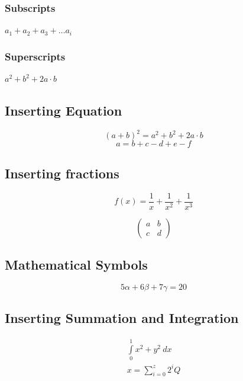 \documentclass[10pt,a4paper,final,conference]{IEEEtran}
\begin{document}
\subsubsection{Subscripts}
$a_1 + a_2 + a_3 + \dots a_i$
\subsubsection{Superscripts}
$a^2 + b^2 +2a \cdot b $


\subsection{Inserting Equation}
\begin{equation}
	(a+b)^2 = a^2 +b^2 + 2 a \cdot b
	\label{eq:1}
\end{equation}
\begin{equation}
a = b+c-d+e-f
\label{eq:simple}
\end{equation}

\subsection{Inserting fractions}
\begin{equation}
f(x) = \frac{1}{x} +\frac{1}{x^2} +\frac{1}{x^3}
\end{equation}

\begin{equation}
\begin{pmatrix}
a&b\\
c&d
\end{pmatrix}
\end{equation}

\subsection{Mathematical Symbols}

\begin{equation}
5\alpha +6\beta +7 \gamma = 20
\end{equation}

\subsection{Inserting Summation and Integration}
\begin{eqnarray}
 \int\limits_0^1 x^2 + y^2 \ dx \\
 x= \sum_{i=0}^{z}2^iQ
\end{eqnarray}
\end{document}

